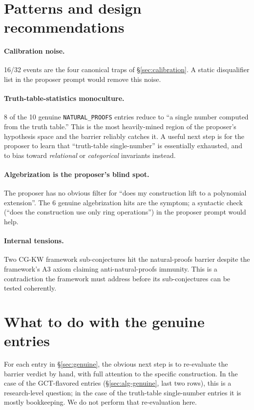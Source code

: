 \documentclass[11pt,a4paper]{article}
\begin{document}
\section{Patterns and design recommendations}\label{sec:patterns}

\paragraph{Calibration noise.} 16/32 events are the four canonical
traps of \S\ref{sec:calibration}. A static disqualifier list in the
proposer prompt would remove this noise.

\paragraph{Truth-table-statistics monoculture.} 8 of the 10 genuine
\texttt{NATURAL\_PROOFS} entries reduce to ``a single number computed
from the truth table.'' This is the most heavily-mined region of the
proposer's hypothesis space and the barrier reliably catches it. A
useful next step is for the proposer to learn that ``truth-table
single-number'' is essentially exhausted, and to bias toward
\emph{relational} or \emph{categorical} invariants instead.

\paragraph{Algebrization is the proposer's blind spot.} The proposer
has no obvious filter for ``does my construction lift to a polynomial
extension''. The 6 genuine algebrization hits are the symptom; a
syntactic check (``does the construction use only ring operations'') in
the proposer prompt would help.

\paragraph{Internal tensions.} Two CG-KW framework sub-conjectures hit
the natural-proofs barrier despite the framework's A3 axiom claiming
anti-natural-proofs immunity. This is a contradiction the framework
must address before its sub-conjectures can be tested coherently.

\section{What to do with the genuine entries}\label{sec:next}

For each entry in \S\ref{sec:genuine}, the obvious next step is to
re-evaluate the barrier verdict by hand, with full attention to the
specific construction. In the case of the GCT-flavored entries
(\S\ref{sec:alg-genuine}, last two rows), this is a research-level
question; in the case of the truth-table single-number entries it is
mostly bookkeeping. We do not perform that re-evaluation here.
\end{document}
